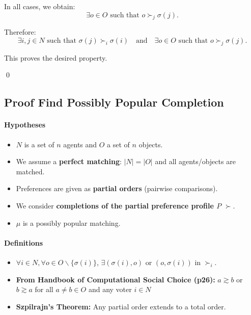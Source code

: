 \documentclass{article}
\begin{document}
\medskip

In all cases, we obtain:
\[
\exists o \in O \text{ such that } o \succ_j \sigma(j).
\]

\medskip

Therefore:
\[
\exists i,j \in N \text{ such that } \sigma(j) \succ_i \sigma(i)
\quad \text{and} \quad
\exists o \in O \text{ such that } o \succ_j \sigma(j).
\]

This proves the desired property.

\qed

\subsection{Proof Find Possibly Popular Completion}

\paragraph{Hypotheses}
\begin{itemize}
    \item $N$ is a set of $n$ agents and $O$ a set of $n$ objects.
    \item We assume a \textbf{perfect matching}: $|N| = |O|$ and all agents/objects are matched.
    \item Preferences are given as \textbf{partial orders} (pairwise comparisons).
    \item We consider \textbf{completions of the partial preference profile $P$} $\succ$.
    \item $\mu$ is a possibly popular matching.
\end{itemize}

\paragraph{Definitions}
\begin{itemize}
    \item $\forall i \in N, \forall o \in O \backslash \{\sigma(i)\}$, $\exists (\sigma(i), o)$ or $(o, \sigma(i))$ in $\succ_i$.
    \item \textbf{From Handbook of Computational Social Choice (p26):} $a \gtrsim b$ or $b \gtrsim a$ for all $a \neq b \in O$ and any voter $i \in N$
    \item \textbf{Szpilrajn's Theorem:} Any partial order extends to a total order.
\end{itemize}
\end{document}
